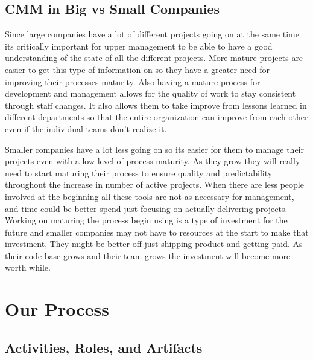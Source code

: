 \documentclass[11pt, indentfirst]{article}
\begin{document}
  \subsection{CMM in Big vs Small Companies}

  Since large companies have a lot of different projects going on at the same time its critically important for upper management to be able to have a good understanding
  of the state of all the different projects. More mature projects are easier to get this type of information on so they have a greater need for improving their processes
  maturity. Also having a mature process for development and management allows for the quality of work to stay consistent through staff changes. It also allows them
  to take improve from lessons learned in different departments so that the entire organization can improve from each other even if the individual teams don't realize it.

  Smaller companies have a lot less going on so its easier for them to manage their projects even with a low level of process maturity. As they grow they will really need to
  start maturing their process to ensure quality and predictability throughout the increase in number of active projects. When there are less people involved at the beginning
  all these tools are not as necessary for management, and time could be better spend just focusing on actually delivering projects. Working on maturing the process begin using
  is a type of investment for the future and smaller companies may not have to resources at the start to make that investment, They might be better off just shipping product
  and getting paid. As their code base grows and their team grows the investment will become more worth while.
  \clearpage
  \section{Our Process}

  \subsection{Activities, Roles, and Artifacts}
\end{document}
